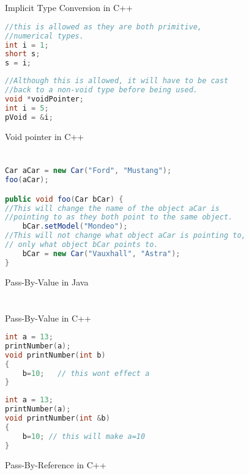 \documentclass[]{report}
\begin{document}
\chapter{}
\begin{figure}[h!]
	\caption{Implicit Type Conversion in C++}
	\begin{lstlisting}[language=C++,frame=single]
//this is allowed as they are both primitive, 
//numerical types.
int i = 1;
short s;
s = i;
	\end{lstlisting}
	\caption{Void pointer in C++}
	\begin{lstlisting}[language=C++,frame=single]
//Although this is allowed, it will have to be cast
//back to a non-void type before being used.
void *voidPointer;
int i = 5;
pVoid = &i; 
	\end{lstlisting}
\end{figure}

\chapter{}
\begin{figure}[h!]
	\caption{Pass-By-Value in Java}
	\begin{lstlisting}[language=Java,frame=single]
Car aCar = new Car("Ford", "Mustang");
foo(aCar);

public void foo(Car bCar) {
//This will change the name of the object aCar is 
//pointing to as they both point to the same object.
	bCar.setModel("Mondeo");
//This will not change what object aCar is pointing to,
// only what object bCar points to.
	bCar = new Car("Vauxhall", "Astra");
}
	\end{lstlisting}
\end{figure}

\chapter{}
\begin{figure}[h!]
	\caption{Pass-By-Value in C++}
	\begin{lstlisting}[language=C++,frame=single]
int a = 13;
printNumber(a);
void printNumber(int b)
{
	b=10;	// this wont effect a
}
	\end{lstlisting}
	\caption{Pass-By-Reference in C++}
	\begin{lstlisting}[language=C++,frame=single]
int a = 13;
printNumber(a);
void printNumber(int &b)
{
	b=10; // this will make a=10
}
	\end{lstlisting}
\end{figure}
\end{document}

